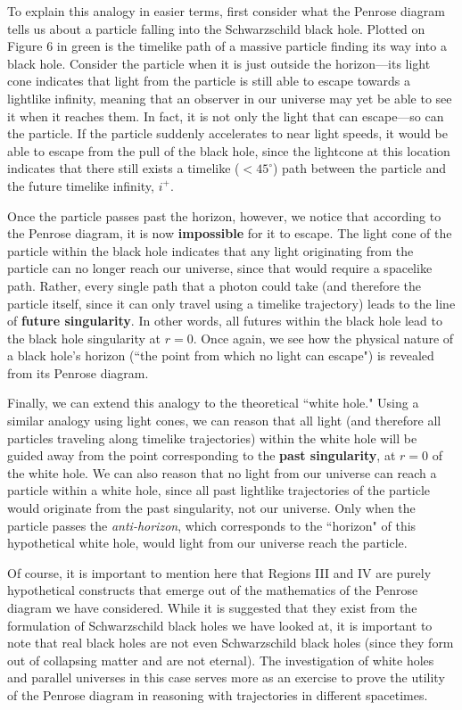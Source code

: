 \documentclass{article}
\begin{document}
To explain this analogy in easier terms, first consider what the Penrose diagram tells us about a particle falling into the Schwarzschild black hole. Plotted on Figure 6 in green is the timelike path of a massive particle finding its way into a black hole. Consider the particle when it is just outside the horizon---its light cone indicates that light from the particle is still able to escape towards a lightlike infinity, meaning that an observer in our universe may yet be able to see it when it reaches them. In fact, it is not only the light that can escape---so can the particle. If the particle suddenly accelerates to near light speeds, it would be able to escape from the pull of the black hole, since the lightcone at this location indicates that there still exists a timelike ($<45^{\circ}$) path between the particle and the future timelike infinity, $i^+$.

Once the particle passes past the horizon, however, we notice that according to the Penrose diagram, it is now \textbf{impossible} for it to escape. The light cone of the particle within the black hole indicates that any light originating from the particle can no longer reach our universe, since that would require a spacelike path. Rather, every single path that a photon could take (and therefore the particle itself, since it can only travel using a timelike trajectory) leads to the line of \textbf{future singularity}. In other words, all futures within the black hole lead to the black hole singularity at $r=0$. Once again, we see how the physical nature of a black hole's horizon (``the point from which no light can escape") is revealed from its Penrose diagram.

Finally, we can extend this analogy to the theoretical ``white hole." Using a similar analogy using light cones, we can reason that all light (and therefore all particles traveling along timelike trajectories) within the white hole will be guided away from the point corresponding to the \textbf{past singularity}, at $r=0$ of the white hole. We can also reason that no light from our universe can reach a particle within a white hole, since all past lightlike trajectories of the particle would originate from the past singularity, not our universe. Only when the particle passes the \textit{anti-horizon}, which corresponds to the ``horizon" of this hypothetical white hole, would light from our universe reach the particle.

Of course, it is important to mention here that Regions III and IV are purely hypothetical constructs that emerge out of the mathematics of the Penrose diagram we have considered. While it is suggested that they exist from the formulation of Schwarzschild black holes we have looked at, it is important to note that real black holes are not even Schwarzschild black holes (since they form out of collapsing matter and are not eternal). The investigation of white holes and parallel universes in this case serves more as an exercise to prove the utility of the Penrose diagram in reasoning with trajectories in different spacetimes. 
\end{document}
